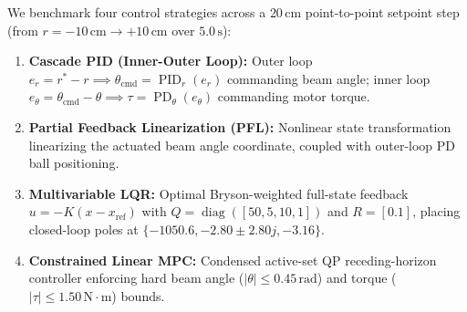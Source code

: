 \documentclass[11pt,a4paper]{article}
\begin{document}
We benchmark four control strategies across a $20\,\text{cm}$ point-to-point setpoint step (from $r = -10\,\text{cm} \to +10\,\text{cm}$ over $5.0\,\text{s}$):
\begin{enumerate}[nosep]
  \item \textbf{Cascade PID (Inner-Outer Loop):} Outer loop $e_r = r^* - r \implies \theta_{\text{cmd}} = \operatorname{PID}_r(e_r)$ commanding beam angle; inner loop $e_\theta = \theta_{\text{cmd}} - \theta \implies \tau = \operatorname{PD}_\theta(e_\theta)$ commanding motor torque.
  \item \textbf{Partial Feedback Linearization (PFL):} Nonlinear state transformation linearizing the actuated beam angle coordinate, coupled with outer-loop PD ball positioning.
  \item \textbf{Multivariable LQR:} Optimal Bryson-weighted full-state feedback $u = -K(x - x_{\text{ref}})$ with $Q = \operatorname{diag}([50, 5, 10, 1])$ and $R = [0.1]$, placing closed-loop poles at $\{-1050.6, -2.80 \pm 2.80j, -3.16\}$.
  \item \textbf{Constrained Linear MPC:} Condensed active-set QP receding-horizon controller enforcing hard beam angle ($|\theta| \le 0.45\,\text{rad}$) and torque ($|\tau| \le 1.50\,\text{N}\cdot\text{m}$) bounds.
\end{enumerate}

\begin{table}[H]
\centering
\small
{}
\caption{Benchmark results for Experiment 33: Ball and beam underactuated balance and setpoint regulation (from \texttt{experiments/33\_ball\_and\_beam\_control/table.md}).}
\label{tab:exp33}
\end{table}
\end{document}
